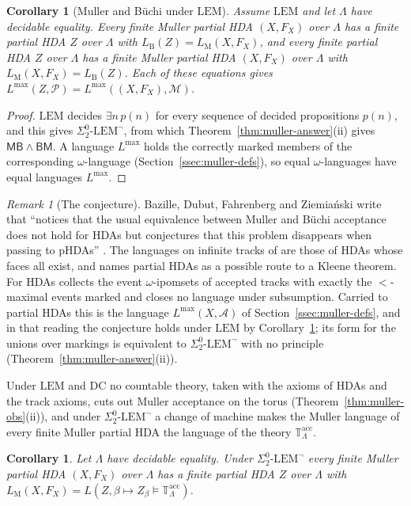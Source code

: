 \documentclass{lmcs}
\newtheorem{corollary}[theorem]{Corollary}
\theoremstyle{definition}
\theoremstyle{remark}
\newtheorem{remark}[theorem]{Remark}
\newcommand{\Tt}{\mathbb{T}}
\newcommand{\prin}[1]{\mathrm{#1}}
\newcommand{\EM}{\prin{LEM}}
\newcommand{\EIO}{\Sigma^0_2\text{-}\prin{LEM}^{\neg}}
\providecommand{\Lang}[2]{L(#1,#2)}
\providecommand{\LB}[1]{L_{\mathrm{B}}(#1)}
\providecommand{\LM}[1]{L_{\mathrm{M}}(#1)}
\providecommand{\MinB}{\mathsf{MB}}
\providecommand{\BinM}{\mathsf{BM}}
\providecommand{\DC}{\prin{DC}}
\providecommand{\Tacc}{\Tt^{\mathrm{acc}}_{\Lambda}}
\providecommand{\Lmax}[1]{L^{\max}(#1)}
\begin{document}
\begin{corollary}[Muller and B\"uchi under $\EM$]\label{cor:muller-classical}
Assume $\EM$ and let $\Lambda$ have decidable equality. Every finite Muller partial HDA $(X,F_X)$ over $\Lambda$ has
a finite partial HDA $Z$ over $\Lambda$ with $\LB{Z}=\LM{X,F_X}$, and every finite partial HDA $Z$ over $\Lambda$ has
a finite Muller partial HDA $(X,F_X)$ over $\Lambda$ with
$\LM{X,F_X}=\LB{Z}$.
Each of these equations gives $\Lmax{Z,\mathcal{P}}=\Lmax{(X,F_X),\mathcal{M}}$.
\end{corollary}

\begin{proof}
$\EM$ decides $\exists n\,p(n)$ for every sequence of decided propositions $p(n)$, and
this gives $\EIO$, from which Theorem~\ref{thm:muller-answer}(ii) gives
$\MinB\wedge\BinM$. A language $L^{\max}$ holds the correctly marked members of
the corresponding $\omega$-language (Section~\ref{ssec:muller-defs}), so equal $\omega$-languages have equal languages
$L^{\max}$.
\end{proof}

\begin{remark}[The conjecture]\label{rem:muller-conjecture}
Bazille, Dubut, Fahrenberg and Ziemia\'nski write that \cite{PAF25} ``notices that the usual equivalence between
Muller and B\"uchi acceptance does not hold for HDAs but conjectures that this problem disappears when passing to
pHDAs'' \cite{BDFZ26}. The languages on infinite tracks of
\cite{PAF25} are those of HDAs whose faces all exist, and \cite{PAF25} names partial HDAs as a possible route to a Kleene theorem. For
HDAs \cite{PAF25} collects the event $\omega$-ipomsets of accepted tracks with exactly the $<$-maximal events marked
and closes no language under subsumption. Carried to partial HDAs this is the language
$\Lmax{X,\mathcal{A}}$ of Section~\ref{ssec:muller-defs}, and in that reading the conjecture holds under $\EM$ by
Corollary~\ref{cor:muller-classical}; its form for the unions over markings is equivalent to $\EIO$ with no
principle (Theorem~\ref{thm:muller-answer}(ii)).
\end{remark}

Under $\EM$ and $\DC$ no countable theory, taken with the axioms of HDAs and the track axioms, cuts out Muller acceptance on the torus
(Theorem~\ref{thm:muller-obs}(ii)), and under $\EIO$ a change of machine makes the Muller language of every finite Muller partial HDA the language of the
theory $\Tacc$.

\begin{corollary}\label{cor:muller-geometric}
Let $\Lambda$ have decidable equality. Under $\EIO$ every finite Muller partial HDA $(X,F_X)$ over $\Lambda$ has a
finite partial HDA $Z$ over $\Lambda$ with $\LM{X,F_X}=\Lang{Z}{\beta\mapsto
Z_\beta\models\Tacc}$.
\end{corollary}
\end{document}
